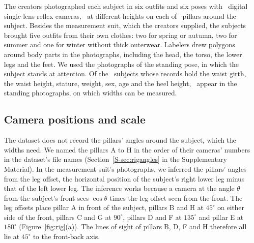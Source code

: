 \documentclass[12pt]{article}
\begin{document}
The creators photographed each subject in six outfits and six poses with \camerasTotal\ digital single-lens reflex
cameras, \camerasPerPillar\ at different heights on each of \pillarsTotal\ pillars around the subject.  Besides the measurement suit, which the creators supplied, the subjects brought five outfits from their own
clothes: two for spring or autumn, two for summer and one for winter without thick outerwear.
Labelers drew polygons around body parts in the photographs, including the head, the torso, the lower legs and the
feet. We used the photographs of the standing pose, in which the subject stands at attention. Of the
\nTapeSubjects\ subjects whose records hold the waist girth, the waist height, stature, weight, sex, age and the heel
height, \nPhotographedSubjects\ appear in the standing photographs, on which widths can be measured.

\subsection{Camera positions and scale}\label{sec:rig}

The dataset does not record the pillars' angles around the subject, which the widths need. We named the pillars A to H in the order of their cameras' numbers in the dataset's file names (Section~\ref{S-sec:rigangles} in the Supplementary
Material). In the measurement suit's photographs, we inferred the pillars' angles from
the leg offset, the horizontal position of the subject's right lower leg minus that of the left lower leg. The inference works because a camera at the angle $\theta$ from the subject's front sees $\cos\theta$ times the leg offset seen from the front. The leg offsets place pillar A in front of the
subject, pillars B and H at $45^\circ$ on either side of the front, pillars C and G at $90^\circ$, pillars D and F
at $135^\circ$ and pillar E at $180^\circ$ (Figure~\ref{fig:rig}(a)). The lines of sight of pillars B, D, F and H therefore all lie at $45^\circ$ to the front-back axis.
\end{document}
